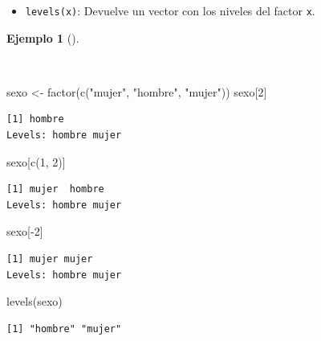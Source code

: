 \documentclass[
  spanish,
  a4paper,
]{scrreport}
\newenvironment{Shaded}{\begin{snugshade}}{\end{snugshade}}
\newcommand{\DecValTok}[1]{\textcolor[rgb]{0.68,0.00,0.00}{#1}}
\newcommand{\FunctionTok}[1]{\textcolor[rgb]{0.28,0.35,0.67}{#1}}
\newcommand{\NormalTok}[1]{\textcolor[rgb]{0.00,0.23,0.31}{#1}}
\newcommand{\OtherTok}[1]{\textcolor[rgb]{0.00,0.23,0.31}{#1}}
\newcommand{\SpecialCharTok}[1]{\textcolor[rgb]{0.37,0.37,0.37}{#1}}
\newcommand{\StringTok}[1]{\textcolor[rgb]{0.13,0.47,0.30}{#1}}
\providecommand{\tightlist}{%
  \setlength{\itemsep}{0pt}\setlength{\parskip}{0pt}}
\theoremstyle{definition}
\theoremstyle{definition}
\newtheorem{example}{Ejemplo}[chapter]
\theoremstyle{remark}
\begin{document}
\begin{itemize}
\tightlist
\item
  \texttt{levels(x)}: Devuelve un vector con los niveles del factor
  \texttt{x}.
\end{itemize}

\begin{example}[]\protect\hypertarget{exm-niveles-factor}{}\label{exm-niveles-factor}

~

\begin{Shaded}
\begin{Highlighting}[]
\NormalTok{sexo }\OtherTok{\textless{}{-}} \FunctionTok{factor}\NormalTok{(}\FunctionTok{c}\NormalTok{(}\StringTok{"mujer"}\NormalTok{, }\StringTok{"hombre"}\NormalTok{, }\StringTok{"mujer"}\NormalTok{))}
\NormalTok{sexo[}\DecValTok{2}\NormalTok{]}
\end{Highlighting}
\end{Shaded}

\begin{verbatim}
[1] hombre
Levels: hombre mujer
\end{verbatim}

\begin{Shaded}
\begin{Highlighting}[]
\NormalTok{sexo[}\FunctionTok{c}\NormalTok{(}\DecValTok{1}\NormalTok{, }\DecValTok{2}\NormalTok{)]}
\end{Highlighting}
\end{Shaded}

\begin{verbatim}
[1] mujer  hombre
Levels: hombre mujer
\end{verbatim}

\begin{Shaded}
\begin{Highlighting}[]
\NormalTok{sexo[}\SpecialCharTok{{-}}\DecValTok{2}\NormalTok{]}
\end{Highlighting}
\end{Shaded}

\begin{verbatim}
[1] mujer mujer
Levels: hombre mujer
\end{verbatim}

\begin{Shaded}
\begin{Highlighting}[]
\FunctionTok{levels}\NormalTok{(sexo)}
\end{Highlighting}
\end{Shaded}

\begin{verbatim}
[1] "hombre" "mujer" 
\end{verbatim}

\end{example}
\end{document}
